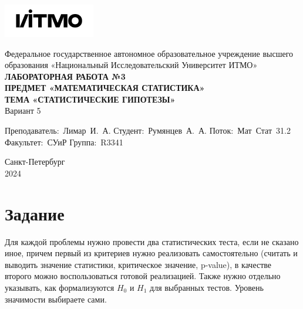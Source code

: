 \documentclass[a4paper, 12pt]{article}
\begin{document}
    \begin{titlepage}

        \begin{center}
        \includegraphics[width=0.3\textwidth]{itmo.png} %
        \vfill
        
        Федеральное государственное автономное образовательное учреждение высшего образования
        «Национальный Исследовательский Университет ИТМО»\\
        
        \vfill
        {\large\bf ЛАБОРАТОРНАЯ РАБОТА №3}\\
        {\large\bf ПРЕДМЕТ «МАТЕМАТИЧЕСКАЯ СТАТИСТИКА»}\\
        {\large\bf ТЕМА «СТАТИСТИЧЕСКИЕ ГИПОТЕЗЫ»}\\
        Вариант 5
        \vfill

        \begin{flushright}
            \begin{minipage}{.45\textwidth}
            {
                \hbox{Преподаватель: Лимар И. А.}
                \hbox{Студент: Румянцев А. А.}
                \hbox{Поток: Мат Стат 31.2}
                \hbox{}
                \hbox{Факультет: СУиР}
                \hbox{Группа: R3341}
            }
            \end{minipage}
        \end{flushright}
        
        \vfill
                
        Санкт-Петербург\\
        2024
        \end{center}
    \end{titlepage}
    
    \tableofcontents

    \newpage
    \section{Задание}
    Для каждой проблемы нужно провести два статистических теста, если не сказано иное, причем
    первый из критериев нужно реализовать самостоятельно (считать и выводить значение статистики,
    критическое значение, p-value), в качестве второго можно воспользоваться готовой реализацией. Также
    нужно отдельно указывать, как формализуются $H_{0}$ и $H_{1}$ для выбранных тестов. Уровень значимости
    выбираете сами.
\end{document}
